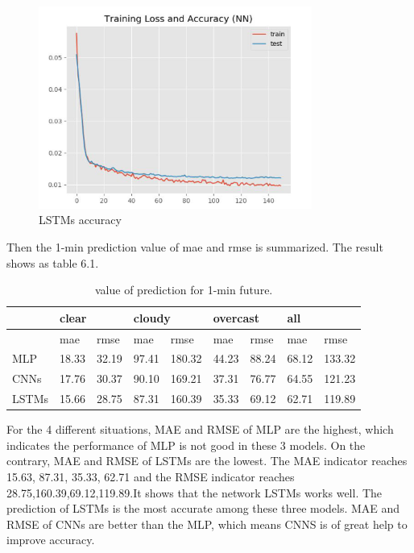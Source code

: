 \begin{figure}[!ht]
	\centering
	\includegraphics[width=0.8\textwidth]{lstm_acc.png}
	\caption{LSTMs accuracy\label{fig:lstm}}
\end{figure}


Then the 1-min prediction value of mae and rmse is  summarized. The result shows as table 6.1.

\begin{table}[h]
\centering
\caption{value of prediction for 1-min future.}
\begin{tabular}{|l|l|l|l|l|l|l|l|l|}
\hline
      & \multicolumn{2}{l|}{clear} & \multicolumn{2}{l|}{cloudy} & \multicolumn{2}{l|}{overcast} & \multicolumn{2}{l|}{all} \\ \hline
      & mae          & rmse        & mae          & rmse         & mae           & rmse          & mae        & rmse        \\ \hline
MLP   & 18.33        & 32.19       & 97.41        & 180.32       & 44.23         & 88.24         & 68.12      & 133.32      \\ \hline
CNNs  & 17.76        & 30.37       & 90.10        & 169.21       & 37.31         & 76.77         & 64.55      & 121.23      \\ \hline
LSTMs & 15.66        & 28.75       & 87.31        & 160.39       & 35.33         & 69.12         & 62.71      & 119.89      \\ \hline
\end{tabular}
\end{table}

For the 4 different situations, MAE and RMSE of MLP are the highest, which indicates the performance of MLP is not good in these 3 models. On the contrary, MAE and RMSE of LSTMs are the lowest. The MAE indicator reaches  15.63, 87.31, 35.33, 62.71 and the RMSE indicator reaches  28.75,160.39,69.12,119.89.It shows that the network LSTMs works well. The prediction of LSTMs is the most accurate among these three models. MAE and RMSE of CNNs are better than the MLP, which means CNNS is of great help to improve accuracy.


